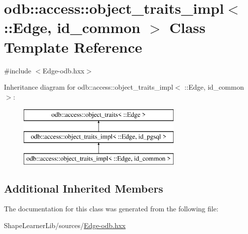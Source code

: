 \hypertarget{classodb_1_1access_1_1object__traits__impl_3_01_1_1_edge_00_01id__common_01_4}{}\section{odb\+:\+:access\+:\+:object\+\_\+traits\+\_\+impl$<$ \+:\+:Edge, id\+\_\+common $>$ Class Template Reference}
\label{classodb_1_1access_1_1object__traits__impl_3_01_1_1_edge_00_01id__common_01_4}


{\ttfamily \#include $<$Edge-\/odb.\+hxx$>$}

Inheritance diagram for odb\+:\+:access\+:\+:object\+\_\+traits\+\_\+impl$<$ \+:\+:Edge, id\+\_\+common $>$\+:\begin{figure}[H]
\begin{center}
\leavevmode
\includegraphics[height=3.000000cm]{d4/d6f/classodb_1_1access_1_1object__traits__impl_3_01_1_1_edge_00_01id__common_01_4}
\end{center}
\end{figure}
\subsection*{Additional Inherited Members}


The documentation for this class was generated from the following file\+:\begin{DoxyCompactItemize}
\item 
Shape\+Learner\+Lib/sources/\hyperlink{_edge-odb_8hxx}{Edge-\/odb.\+hxx}\end{DoxyCompactItemize}
